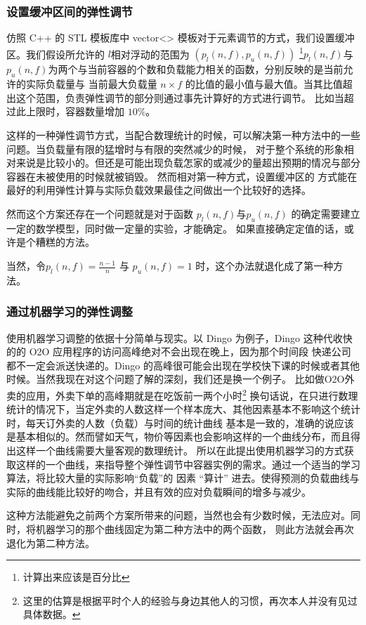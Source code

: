 \subsubsection{设置缓冲区间的弹性调节}
仿照 C++ 的 STL 模板库中 vector<> 模板对于元素调节的方式，我们设置缓冲区。我们假设所允许的 $l$相对浮动的范围为 $(p_l(n,f),p_u(n,f))$
\footnote{计算出来应该是百分比}$p_l(n,f)$与$p_u(n,f)$为两个与当前容器的个数和负载能力相关的函数，分别反映的是当前允许的实际负载量与
当前最大负载量 $n \times f$ 的比值的最小值与最大值。当其比值超出这个范围，负责弹性调节的部分则通过事先计算好的方式进行调节。
比如当超过此上限时，容器数量增加 $10\%$。

这样的一种弹性调节方式，当配合数理统计的时候，可以解决第一种方法中的一些问题。当负载量有限的猛增时与有限的突然减少的时候，
对于整个系统的形象相对来说是比较小的。但还是可能出现负载怎家的或减少的量超出预期的情况与部分容器在未被使用的时候就被销毁。
然而相对第一种方式，设置缓冲区的 方式能在最好的利用弹性计算与实际负载效果最佳之间做出一个比较好的选择。

然而这个方案还存在一个问题就是对于函数 $p_l(n,f)$与$p_u(n,f)$ 的确定需要建立一定的数学模型，同时做一定量的实验，才能确定。
如果直接确定定值的话，或许是个糟糕的方法。

当然，令$p_l(n,f)=\frac{n-1}{n}$ 与 $p_u(n,f)=1$ 时，这个办法就退化成了第一种方法。
\subsubsection{通过机器学习的弹性调整}
使用机器学习调整的依据十分简单与现实。以 Dingo 为例子，Dingo 这种代收快的的 O2O 应用程序的访问高峰绝对不会出现在晚上，因为那个时间段
快递公司都不一定会派送快递的。Dingo 的高峰很可能会出现在学校快下课的时候或者其他时候。当然我现在对这个问题了解的深刻，我们还是换一个例子。
比如做O2O外卖的应用，外卖下单的高峰期就是在吃饭前一两个小时\footnote{这里的估算是根据平时个人的经验与身边其他人的习惯，再次本人并没有见过具体数据。}
换句话说，在只进行数理统计的情况下，当定外卖的人数这样一个样本庞大、其他因素基本不影响这个统计时，每天订外卖的人数（负载）与时间的统计曲线
基本是一致的，准确的说应该是基本相似的。然而譬如天气，物价等因素也会影响这样的一个曲线分布，而且得出这样一个曲线需要大量客观的数理统计。
所以在此提出使用机器学习的方式获取这样的一个曲线，来指导整个弹性调节中容器实例的需求。通过一个适当的学习算法，将比较大量的实际影响“负载”的
因素 “算计” 进去。使得预测的负载曲线与实际的曲线能比较好的吻合，并且有效的应对负载瞬间的增多与减少。

这种方法能避免之前两个方案所带来的问题，当然也会有少数时候，无法应对。同时，将机器学习的那个曲线固定为第二种方法中的两个函数，
则此方法就会再次退化为第二种方法。

